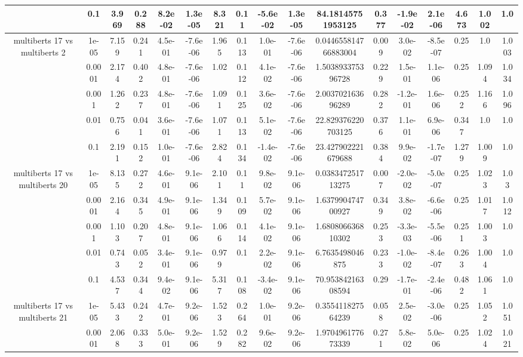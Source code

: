\begin{tabular}{|c|c|c|c|c|c|c|c|c|c|c|c|c|c|c|c|c|}
 & 0.1 & 3.969 & 0.288 & 8.2e-02 & 1.3e-05 & 8.321 & 0.11 & -5.6e-02 & 1.3e-05 & 84.18145751953125 & 0.377 & -1.9e-02 & 2.1e-06 & 4.673 & 1.002 & 1.0 \\
\hline
\multirow{5}{*}{multiberts 17 vs multiberts 2} & 1e-05 & 7.159 & 0.241 & 4.5e-01 & -7.6e-06 & 1.965 & 0.113 & 1.0e-01 & -7.6e-06 & 0.044655814766883004 & 0.009 & 3.0e-02 & -8.5e-07 & 0.25 & 1.0 & 1.003 \\
 & 0.0001 & 2.174 & 0.402 & 4.8e-01 & -7.6e-06 & 1.02 & 0.112 & 4.1e-02 & -7.6e-06 & 1.503893375396728 & 0.229 & 1.5e-01 & 1.1e-06 & 0.25 & 1.094 & 1.034 \\
 & 0.001 & 1.262 & 0.237 & 4.8e-01 & -7.6e-06 & 1.091 & 0.125 & 3.6e-02 & -7.6e-06 & 2.003702163696289 & 0.282 & -1.2e-01 & 1.6e-06 & 0.252 & 1.166 & 1.096 \\
 & 0.01 & 0.756 & 0.041 & 3.6e-01 & -7.6e-06 & 1.071 & 0.113 & 5.1e-02 & -7.6e-06 & 22.829376220703125 & 0.376 & 1.1e-01 & 6.9e-06 & 0.347 & 1.0 & 1.0 \\
 & 0.1 & 2.191 & 0.152 & 1.0e-01 & -7.6e-06 & 2.824 & 0.134 & -1.4e-02 & -7.6e-06 & 23.427902221679688 & 0.384 & 9.9e-02 & -1.7e-07 & 1.279 & 1.009 & 1.0 \\
\hline
\multirow{5}{*}{multiberts 17 vs multiberts 20} & 1e-05 & 8.135 & 0.272 & 4.6e-01 & 9.1e-06 & 2.101 & 0.11 & 9.8e-02 & 9.1e-06 & 0.038347251713275 & 0.007 & -2.0e-02 & -5.0e-07 & 0.25 & 1.023 & 1.03 \\
 & 0.0001 & 2.164 & 0.345 & 4.9e-01 & 9.1e-06 & 1.349 & 0.109 & 5.7e-02 & 9.1e-06 & 1.637990474700927 & 0.349 & 3.8e-02 & -6.6e-06 & 0.25 & 1.017 & 1.012 \\
 & 0.001 & 1.103 & 0.207 & 4.8e-01 & 9.1e-06 & 1.066 & 0.114 & 4.1e-02 & 9.1e-06 & 1.680806636810302 & 0.253 & -3.3e-03 & -5.5e-06 & 0.251 & 1.003 & 1.0 \\
 & 0.01 & 0.743 & 0.052 & 3.4e-01 & 9.1e-06 & 0.979 & 0.1 & 2.2e-02 & 9.1e-06 & 6.7635498046875 & 0.233 & -1.0e-02 & -8.4e-07 & 0.263 & 1.004 & 1.0 \\
 & 0.1 & 4.537 & 0.344 & 9.4e-02 & 9.1e-06 & 5.317 & 0.108 & -3.4e-02 & 9.1e-06 & 70.95384216308594 & 0.29 & -1.7e-01 & -2.4e-06 & 0.482 & 1.061 & 1.0 \\
\hline
\multirow{5}{*}{multiberts 17 vs multiberts 21} & 1e-05 & 5.433 & 0.242 & 4.7e-01 & 9.2e-06 & 1.523 & 0.264 & 1.0e-01 & 9.2e-06 & 0.355411827564239 & 0.058 & 2.5e-02 & -3.0e-06 & 0.25 & 1.052 & 1.051 \\
 & 0.0001 & 2.068 & 0.333 & 5.0e-01 & 9.2e-06 & 1.529 & 0.282 & 9.6e-02 & 9.2e-06 & 1.970496177673339 & 0.271 & 5.8e-02 & 5.0e-06 & 0.25 & 1.024 & 1.021 \\

\end{tabular}
